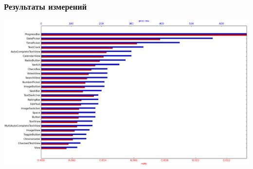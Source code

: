 \documentclass{beamer}
\begin{document}
    \begin{frame}
        \frametitle{Результаты измерений}
        \includegraphics[width=\linewidth]{result_scaled}
    \end{frame}
\end{document}
